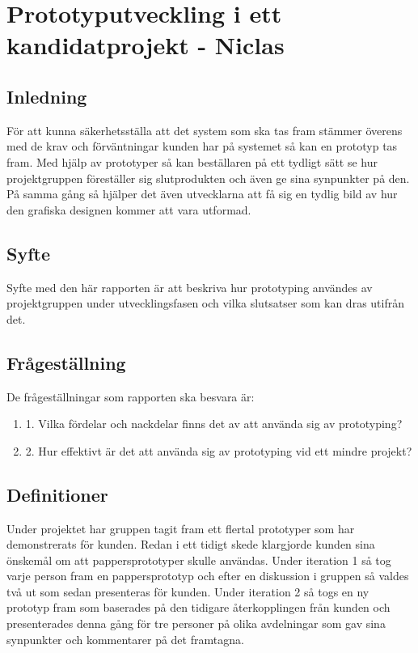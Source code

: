 \chapter{Prototyputveckling i ett kandidatprojekt - Niclas}
\section{Inledning}
För att kunna säkerhetsställa att det system som ska tas fram stämmer överens med de krav och förväntningar kunden har på systemet så kan en prototyp tas fram. Med hjälp av prototyper så kan beställaren på ett tydligt sätt se hur projektgruppen föreställer sig slutprodukten och även ge sina synpunkter på den. På samma gång så hjälper det även utvecklarna att få sig en tydlig bild av hur den grafiska designen kommer att vara utformad. 

\section{Syfte}
Syfte med den här rapporten är att beskriva hur prototyping användes av projektgruppen under utvecklingsfasen och vilka slutsatser som kan dras utifrån det.   

\section{Frågeställning}
De frågeställningar som rapporten ska besvara är:
\begin{enumerate}
	\item 1. Vilka fördelar och nackdelar finns det av att använda sig av prototyping?
	\item 2. Hur effektivt är det att använda sig av prototyping vid ett mindre projekt?
\end{enumerate}

\section{Definitioner}
Under projektet har gruppen tagit fram ett flertal prototyper som har demonstrerats för kunden. Redan i ett tidigt skede klargjorde kunden sina önskemål om att pappersprototyper skulle användas. Under iteration 1 så tog varje person fram en pappersprototyp och efter en diskussion i gruppen så valdes två ut som sedan presenteras för kunden.  Under iteration 2 så togs en ny prototyp fram som baserades på den tidigare återkopplingen från kunden och presenterades denna gång för tre personer på olika avdelningar som gav sina synpunkter och kommentarer på det framtagna.  

